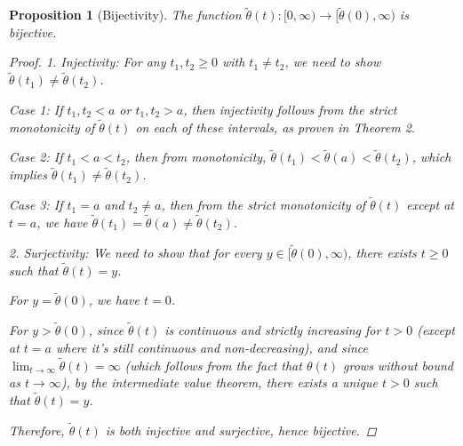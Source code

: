 \documentclass{article}
\newtheorem{proposition}[theorem]{Proposition}
\theoremstyle{definition}
\begin{document}
\begin{proposition}[Bijectivity]
The function $\tilde{\theta}(t): [0,\infty) \to [\tilde{\theta}(0),\infty)$ is bijective.

\begin{proof}
1. Injectivity: For any $t_1, t_2 \geq 0$ with $t_1 \neq t_2$, we need to show $\tilde{\theta}(t_1) \neq \tilde{\theta}(t_2)$.

Case 1: If $t_1, t_2 < a$ or $t_1, t_2 > a$, then injectivity follows from the strict monotonicity of $\tilde{\theta}(t)$ on each of these intervals, as proven in Theorem 2.

Case 2: If $t_1 < a < t_2$, then from monotonicity, $\tilde{\theta}(t_1) < \tilde{\theta}(a) < \tilde{\theta}(t_2)$, which implies $\tilde{\theta}(t_1) \neq \tilde{\theta}(t_2)$.

Case 3: If $t_1 = a$ and $t_2 \neq a$, then from the strict monotonicity of $\tilde{\theta}(t)$ except at $t = a$, we have $\tilde{\theta}(t_1) = \tilde{\theta}(a) \neq \tilde{\theta}(t_2)$.

2. Surjectivity: We need to show that for every $y \in [\tilde{\theta}(0),\infty)$, there exists $t \geq 0$ such that $\tilde{\theta}(t) = y$.

For $y = \tilde{\theta}(0)$, we have $t = 0$.

For $y > \tilde{\theta}(0)$, since $\tilde{\theta}(t)$ is continuous and strictly increasing for $t > 0$ (except at $t = a$ where it's still continuous and non-decreasing), and since $\lim_{t\to\infty}\tilde{\theta}(t) = \infty$ (which follows from the fact that $\theta(t)$ grows without bound as $t \to \infty$), by the intermediate value theorem, there exists a unique $t > 0$ such that $\tilde{\theta}(t) = y$.

Therefore, $\tilde{\theta}(t)$ is both injective and surjective, hence bijective.
\end{proof}
\end{proposition}
\end{document}
